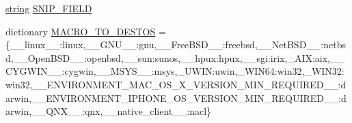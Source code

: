 \begin{DoxyCompactItemize}
\hyperlink{test__lib_f_l_a_c_2format_8c_ab02026ad0de9fb6c1b4233deb0a00c75}{string} \hyperlink{namespacewaflib_1_1_tools_1_1c__config_a7ae527a664c65069f7fb2d53ede81b36}{S\+N\+I\+P\+\_\+\+F\+I\+E\+LD}
\item 
dictionary \hyperlink{namespacewaflib_1_1_tools_1_1c__config_a4fa8f7f8c1a631c0828c7d99729ba544}{M\+A\+C\+R\+O\+\_\+\+T\+O\+\_\+\+D\+E\+S\+T\+OS} = \{\textquotesingle{}\+\_\+\+\_\+linux\+\_\+\+\_\+\textquotesingle{}\+:\textquotesingle{}linux\textquotesingle{},\textquotesingle{}\+\_\+\+\_\+\+G\+N\+U\+\_\+\+\_\+\textquotesingle{}\+:\textquotesingle{}gnu\textquotesingle{},\textquotesingle{}\+\_\+\+\_\+\+Free\+B\+S\+D\+\_\+\+\_\+\textquotesingle{}\+:\textquotesingle{}freebsd\textquotesingle{},\textquotesingle{}\+\_\+\+\_\+\+Net\+B\+S\+D\+\_\+\+\_\+\textquotesingle{}\+:\textquotesingle{}netbsd\textquotesingle{},\textquotesingle{}\+\_\+\+\_\+\+Open\+B\+S\+D\+\_\+\+\_\+\textquotesingle{}\+:\textquotesingle{}openbsd\textquotesingle{},\textquotesingle{}\+\_\+\+\_\+sun\textquotesingle{}\+:\textquotesingle{}sunos\textquotesingle{},\textquotesingle{}\+\_\+\+\_\+hpux\textquotesingle{}\+:\textquotesingle{}hpux\textquotesingle{},\textquotesingle{}\+\_\+\+\_\+sgi\textquotesingle{}\+:\textquotesingle{}irix\textquotesingle{},\textquotesingle{}\+\_\+\+A\+IX\textquotesingle{}\+:\textquotesingle{}aix\textquotesingle{},\textquotesingle{}\+\_\+\+\_\+\+C\+Y\+G\+W\+I\+N\+\_\+\+\_\+\textquotesingle{}\+:\textquotesingle{}cygwin\textquotesingle{},\textquotesingle{}\+\_\+\+\_\+\+M\+S\+Y\+S\+\_\+\+\_\+\textquotesingle{}\+:\textquotesingle{}msys\textquotesingle{},\textquotesingle{}\+\_\+\+U\+W\+IN\textquotesingle{}\+:\textquotesingle{}uwin\textquotesingle{},\textquotesingle{}\+\_\+\+W\+I\+N64\textquotesingle{}\+:\textquotesingle{}win32\textquotesingle{},\textquotesingle{}\+\_\+\+W\+I\+N32\textquotesingle{}\+:\textquotesingle{}win32\textquotesingle{},\textquotesingle{}\+\_\+\+\_\+\+E\+N\+V\+I\+R\+O\+N\+M\+E\+N\+T\+\_\+\+M\+A\+C\+\_\+\+O\+S\+\_\+\+X\+\_\+\+V\+E\+R\+S\+I\+O\+N\+\_\+\+M\+I\+N\+\_\+\+R\+E\+Q\+U\+I\+R\+E\+D\+\_\+\+\_\+\textquotesingle{}\+:\textquotesingle{}darwin\textquotesingle{},\textquotesingle{}\+\_\+\+\_\+\+E\+N\+V\+I\+R\+O\+N\+M\+E\+N\+T\+\_\+\+I\+P\+H\+O\+N\+E\+\_\+\+O\+S\+\_\+\+V\+E\+R\+S\+I\+O\+N\+\_\+\+M\+I\+N\+\_\+\+R\+E\+Q\+U\+I\+R\+E\+D\+\_\+\+\_\+\textquotesingle{}\+:\textquotesingle{}darwin\textquotesingle{},\textquotesingle{}\+\_\+\+\_\+\+Q\+N\+X\+\_\+\+\_\+\textquotesingle{}\+:\textquotesingle{}qnx\textquotesingle{},\textquotesingle{}\+\_\+\+\_\+native\+\_\+client\+\_\+\+\_\+\textquotesingle{}\+:\textquotesingle{}nacl\textquotesingle{}\}

\end{DoxyCompactItemize}
